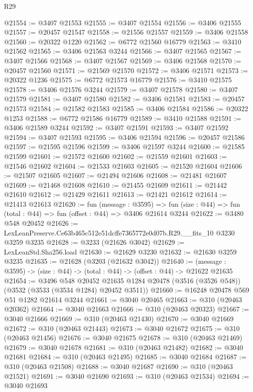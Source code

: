 \begin{lexlean}{R29}
\begin{coremodule}
@21554 := @3407 @21553
@21555 := @3407 @21554
@21556 := @3406 @21555
@21557 := @20457 @21547
@21558 := @21556 @21557
@21559 := @3406 @21558
@21560 := @20322 @1220
@21562 := @6772 @21560 @16779
@21563 := @3410 @21562
@21565 := @3406 @21563 @3244
@21566 := @3407 @21565
@21567 := @3407 @21566
@21568 := @3407 @21567
@21569 := @3406 @21568
@21570 := @20457 @21560
@21571 := @21569 @21570
@21572 := @3406 @21571
@21573 := @20322 @1236
@21575 := @6772 @21573 @16779
@21576 := @3410 @21575
@21578 := @3406 @21576 @3244
@21579 := @3407 @21578
@21580 := @3407 @21579
@21581 := @3407 @21580
@21582 := @3406 @21581
@21583 := @20457 @21573
@21584 := @21582 @21583
@21585 := @3406 @21584
@21586 := @20322 @1253
@21588 := @6772 @21586 @16779
@21589 := @3410 @21588
@21591 := @3406 @21589 @3244
@21592 := @3407 @21591
@21593 := @3407 @21592
@21594 := @3407 @21593
@21595 := @3406 @21594
@21596 := @20457 @21586
@21597 := @21595 @21596
@21599 := @3406 @21597 @3244
@21600 := @21585 @21599
@21601 := @21572 @21600
@21602 := @21559 @21601
@21603 := @21546 @21602
@21604 := @21533 @21603
@21605 := @21520 @21604
@21606 := @21507 @21605
@21607 := @21494 @21606
@21608 := @21481 @21607
@21609 := @21468 @21608
@21610 := @21455 @21609
@21611 := @21442 @21610
@21612 := @21429 @21611
@21613 := @21421 @21612
@21614 := @21413 @21613
@21620 := fun (message : @3595) =>
  fun (size : @44) => fun (total : @44) => fun (offset : @44) => @3406 @21614 @3244
@21622 := @3480 @548 @20452
@21626 := LexLeanPreserve.Ce63b465c512e51dcffe7365772e0d07b.R29.__fits_10 @3230 @3259 @3235
@21628 := @3233 (@21626 @3042)
@21629 := LexLeanStd.Sha256.load
@21630 := @21629 @3230
@21632 := @21630 @3259 @3235
@21635 := @21628 (@3203 (@21632 @3042))
@21640 := (message : @3595) -> (size : @44) -> (total : @44) -> (offset : @44) -> @21622 @21635
@21654 := @3496
    @548
    @20452
    @21635
    @1284
    @20478
    (@3516 (@3526 @548))
    (@3532 (@3533 (@3534 @1284) @20452 @3511))
@21660 := @16248 @20478 @569 @51 @1282 @21614 @3244
@21661 := @3040 @20465
@21663 := @310 (@20463 @20362)
@21664 := @3040 @21663
@21666 := @310 (@20463 @20323)
@21667 := @3040 @21666
@21669 := @310 (@20463 @21430)
@21670 := @3040 @21669
@21672 := @310 (@20463 @21443)
@21673 := @3040 @21672
@21675 := @310 (@20463 @21456)
@21676 := @3040 @21675
@21678 := @310 (@20463 @21469)
@21679 := @3040 @21678
@21681 := @310 (@20463 @21482)
@21682 := @3040 @21681
@21684 := @310 (@20463 @21495)
@21685 := @3040 @21684
@21687 := @310 (@20463 @21508)
@21688 := @3040 @21687
@21690 := @310 (@20463 @21521)
@21691 := @3040 @21690
@21693 := @310 (@20463 @21534)
@21694 := @3040 @21693

\end{coremodule}
\end{lexlean}
